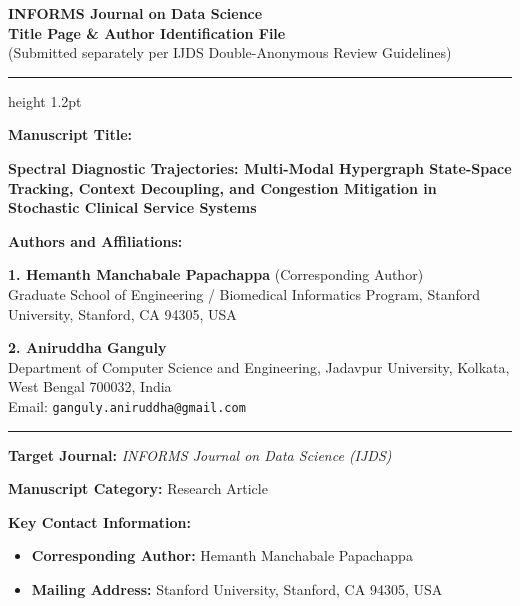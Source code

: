 \documentclass[11pt,letterpaper]{article}
\begin{document}
\begin{center}
    {\LARGE \textbf{INFORMS Journal on Data Science}}\\[4pt]
    {\large \textbf{Title Page \& Author Identification File}}\\[2pt]
    {\normalsize (Submitted separately per IJDS Double-Anonymous Review Guidelines)}
\end{center}

\vspace{6pt}
\hrule height 1.2pt
\vspace{8pt}

\textbf{\large Manuscript Title:}
\vspace{2pt}

{\large \textbf{Spectral Diagnostic Trajectories: Multi-Modal Hypergraph State-Space Tracking, Context Decoupling, and Congestion Mitigation in Stochastic Clinical Service Systems}}

\vspace{8pt}

\textbf{\large Authors and Affiliations:}
\vspace{4pt}

\textbf{1. Hemanth Manchabale Papachappa} (Corresponding Author)\\
Graduate School of Engineering / Biomedical Informatics Program, Stanford University, Stanford, CA 94305, USA

\vspace{4pt}

\textbf{2. Aniruddha Ganguly}\\
Department of Computer Science and Engineering, Jadavpur University, Kolkata, West Bengal 700032, India\\
Email: \texttt{ganguly.aniruddha@gmail.com}

\vspace{8pt}
\hrule
\vspace{8pt}

\textbf{\large Target Journal:} \textit{INFORMS Journal on Data Science (IJDS)}

\textbf{\large Manuscript Category:} Research Article

\textbf{\large Key Contact Information:}
\begin{itemize}\setlength{\itemsep}{2pt}\setlength{\parskip}{0pt}
    \item \textbf{Corresponding Author:} Hemanth Manchabale Papachappa
    \item \textbf{Mailing Address:} Stanford University, Stanford, CA 94305, USA
\end{itemize}
\end{document}
